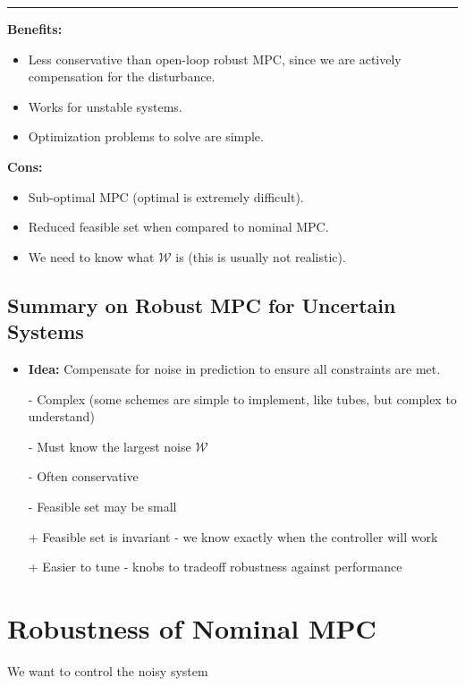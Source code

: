 \documentclass[8pt,a4paper]{scrartcl}
\begin{document}
\begin{multicols*}{3}
\hrule

\finn

\textbf{Benefits:}
\begin{itemize}
\ncompaq
\item Less conservative than open-loop robust MPC, since we are actively compensation for the disturbance.
\item Works for unstable systems.
\item Optimization problems to solve are simple.
\end{itemize}

\textbf{Cons:}
\begin{itemize}
\ncompaq
\item Sub-optimal MPC (optimal is extremely difficult).
\item Reduced feasible set when compared to nominal MPC.
\item We need to know what $\mathcal{W}$ is (this is usually not realistic).
\end{itemize}

\subsection{Summary on Robust MPC for Uncertain Systems}

\begin{itemize}
\item \textbf{Idea:} Compensate for noise in prediction to ensure all constraints are met.
\item[-] Complex (some schemes are simple to implement, like tubes, but complex to understand)
\item[-] Must know the largest noise $\mathcal{W}$
\item[-] Often conservative
\item[-] Feasible set may be small
\item[+] Feasible set is invariant - we know exactly when the controller will work
\item[+] Easier to tune - knobs to tradeoff robustness against performance
\end{itemize}

\section{Robustness of Nominal MPC}

We want to control the noisy system



\end{multicols*}
\end{document}
